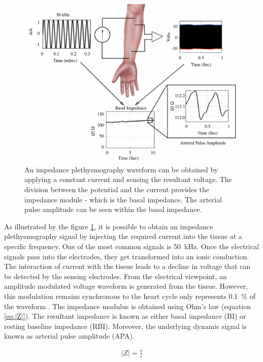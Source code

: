 \begin{figure}[!htpb]
	\centering
	\includegraphics[width=\textwidth,keepaspectratio]{figure15}    
	\caption[How to get an impedance plethysmography waveform]{An impedance plethysmography waveform can be obtained by applying a constant current and sensing the resultant voltage. The division between the potential and the current provides the impedance module - which is the basal impedance. The arterial pulse amplitude can be seen within the basal impedance.}
	\label{fig:envelope iPG}
\end{figure}

As illustrated by the figure \ref{fig:envelope iPG}, it is possible to obtain an impedance plethysmography signal by injecting the required current into the tissue at a specific frequency. One of the most common signals is \SI{50}{\kilo\hertz}. Once the electrical signals pass into the electrodes, they get transformed into an ionic conduction. The interaction of current with the tissue leads to a decline in voltage that can be detected by the sensing electrodes. From the electrical viewpoint, an amplitude modulated voltage waveform is generated from the tissue. However, this modulation remains synchronous to the heart cycle only represents \SI{0.1}{\percent} of the waveform \cite{anderson1984impedance}. 
The impedance modulus is obtained using Ohm's law (equation \ref{eq:|Z|}). The resultant impedance is known as either basal impedance (BI) or resting baseline impedance (RBI). Moreover, the underlying dynamic signal is known as arterial pulse amplitude (APA). 

\begin{align}
	\label{eq:|Z|}
	\left| Z \right| = \frac{v}{i}
\end{align}


